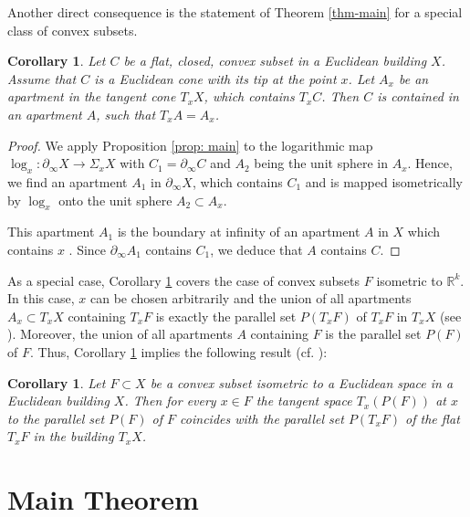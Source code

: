 \documentclass[12pt,leqno]{amsart}
\numberwithin{equation}{section}
\newtheorem{cor}[thm]{Corollary}
\theoremstyle{definition}
\theoremstyle{remark}
\newcommand{\R}{\mathbb{R}}
\begin{document}
Another direct consequence is the statement of Theorem \ref{thm-main} for a special class of convex subsets.


\begin{cor} \label{cor: cone}
Let $C$ be a flat, closed, convex subset in a Euclidean building $X$. Assume that $C$ is a Euclidean cone with its tip at the point $x$.  Let $A_x$ be an apartment in the tangent cone $T_xX$, which contains $T_xC$.  Then $C$ is contained in an apartment $A$, such that $T_xA=A_x$.
\end{cor}

\begin{proof}
We apply Proposition \ref{prop: main} to the logarithmic map $\log_x: \partial _{\infty} X\to \Sigma _xX$  with $C_1=\partial _{\infty} C$ and $A_2$ being the unit sphere in $A_x$.  Hence, we find  an apartment $A_1$ in $\partial _{\infty} X$, which contains $C_1$ and  is mapped isometrically by $\log _x$ onto the unit sphere $A_2\subset A_x$.



This apartment  $A_1$ is the boundary at infinity of an apartment $A$ in $X$ which contains $x$  \cite[Lemma 2.3.4]{KleinerLeeb1}. Since $\partial_{\infty} A_1$ contains $C_1$, we deduce that $A$ contains $C$.
\end{proof}
	
As a special case, Corollary \ref{cor: cone} covers the case of convex subsets $F$ isometric to $\R^k$.  In this case, $x$ can be chosen arbitrarily  and the union of all apartments $A_x\subset T_xX$ containing $T_xF$ is exactly the parallel set $P(T_xF)$ of $T_xF$ in $T_xX$
(see \cite[Section 4.8]{KleinerLeeb1}).  Moreover, the union of all apartments $A$ containing $F$ is the parallel set $P(F)$ of $F$.  Thus, Corollary \ref{cor: cone} implies the following result (cf. \cite{BM}):

\begin{cor}
Let $F\subset X$ be a convex subset isometric to a Euclidean space in a Euclidean building $X$. Then for every $x\in F$ the tangent space $T_x(P(F))$ at $x$ to the parallel set $P(F)$ of $F$ coincides with the parallel set $P(T_xF)$ of the flat $T_xF$ in the building $T_xX$. 
\end{cor}


 
 \section{Main Theorem}
 
 
	
\end{document}
